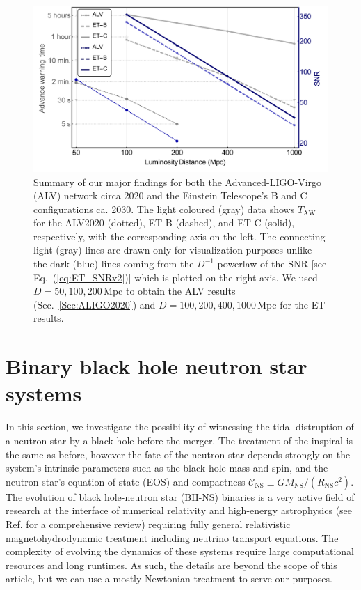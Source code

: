 \documentclass[prd,amsmath,amssymb,aps,floats,amsfonts,notitlepage,superscriptaddress,eqsecnum,nofootinbib,10pt]{revtex4-1}
\begin{document}
\begin{figure}[ht!]
\includegraphics[width=\linewidth]{../Figures/Main_results.pdf}
\caption{Summary of our major findings for both the Advanced-LIGO-Virgo (ALV) network circa 2020 and the Einstein Telescope's B and C configurations
ca. 2030. The light coloured (gray) data shows $T_\text{AW}$ for the ALV2020 (dotted), ET-B (dashed), and ET-C (solid), respectively, with the corresponding axis on the left.
The connecting light (gray) lines are drawn only for visualization purposes unlike the dark (blue) lines coming from the $D^{-1}$ powerlaw of the SNR [see Eq.~(\ref{eq:ET_SNRv2})] which is plotted on the right axis. 
We used $D=50,100,200\,$Mpc to obtain the ALV results (Sec.~\ref{Sec:ALIGO2020}) and $D=100,200,400,1000\,$Mpc for the ET results.}\label{fig:summary}
\end{figure}
%
%
%
%
%
\section{Binary black hole neutron star systems}\label{sec:BH_NS}
In this section, we investigate the possibility of witnessing the tidal distruption of a neutron star by a black hole before the merger.
The treatment of the inspiral is the same as before, however the fate of the neutron star depends strongly on the system's intrinsic parameters
such as the black hole mass and spin, and the neutron star's equation of state (EOS) and compactness $\mathcal{C}_\text{NS}\equiv G M_\text{NS}/(R_\text{NS}c^2)$. 
The evolution of black hole-neutron star (BH-NS) binaries is a very active field of research at the interface of numerical relativity and high-energy astrophysics
(see Ref. \cite{Shibata:2011jka} for a comprehensive review) requiring fully general relativistic magnetohydrodynamic treatment including neutrino transport equations.
The complexity of evolving the dynamics of these systems require large computational resources and long runtimes.
As such, the details are beyond the scope of this article, but we can use a mostly Newtonian treatment to serve our purposes. %
\end{document}
